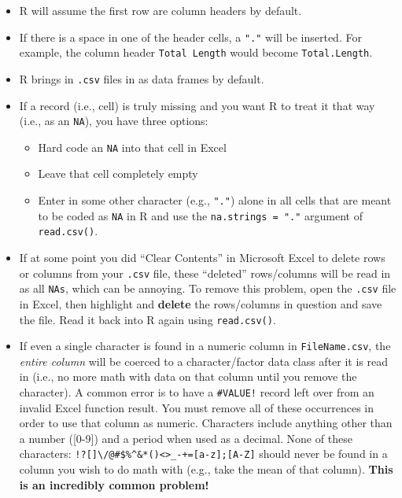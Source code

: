 \documentclass[]{book}
\providecommand{\tightlist}{%
  \setlength{\itemsep}{0pt}\setlength{\parskip}{0pt}}
\theoremstyle{definition}
\theoremstyle{definition}
\theoremstyle{definition}
\theoremstyle{remark}
\begin{document}
\begin{itemize}
\tightlist
\item
  R will assume the first row are column headers by default.
\item
  If there is a space in one of the header cells, a \texttt{"."} will be
  inserted. For example, the column header \texttt{Total\ Length} would
  become \texttt{Total.Length}.
\item
  R brings in \texttt{.csv} files in as data frames by default.
\item
  If a record (i.e., cell) is truly missing and you want R to treat it
  that way (i.e., as an \texttt{NA}), you have three options:

  \begin{itemize}
  \tightlist
  \item
    Hard code an \texttt{NA} into that cell in Excel
  \item
    Leave that cell completely empty
  \item
    Enter in some other character (e.g., \texttt{"."}) alone in all
    cells that are meant to be coded as \texttt{NA} in R and use the
    \texttt{na.strings\ =\ "."} argument of \texttt{read.csv()}.
  \end{itemize}
\item
  If at some point you did ``Clear Contents'' in Microsoft Excel to
  delete rows or columns from your \texttt{.csv} file, these ``deleted''
  rows/columns will be read in as all \texttt{NAs}, which can be
  annoying. To remove this problem, open the \texttt{.csv} file in
  Excel, then highlight and \textbf{delete} the rows/columns in question
  and save the file. Read it back into R again using
  \texttt{read.csv()}.
\item
  If even a single character is found in a numeric column in
  \texttt{FileName.csv}, the \emph{entire column} will be coerced to a
  character/factor data class after it is read in (i.e., no more math
  with data on that column until you remove the character). A common
  error is to have a \texttt{\#VALUE!} record left over from an invalid
  Excel function result. You must remove all of these occurrences in
  order to use that column as numeric. Characters include anything other
  than a number ({[}0-9{]}) and a period when used as a decimal. None of
  these characters:
  \texttt{!?{[}{]}\textbackslash{}/@\#\$\%\^{}\&*()\textless{}\textgreater{}\_-+={[}a-z{]};{[}A-Z{]}}
  should never be found in a column you wish to do math with (e.g., take
  the mean of that column). \textbf{This is an incredibly common
  problem!}
\end{itemize}
\end{document}
